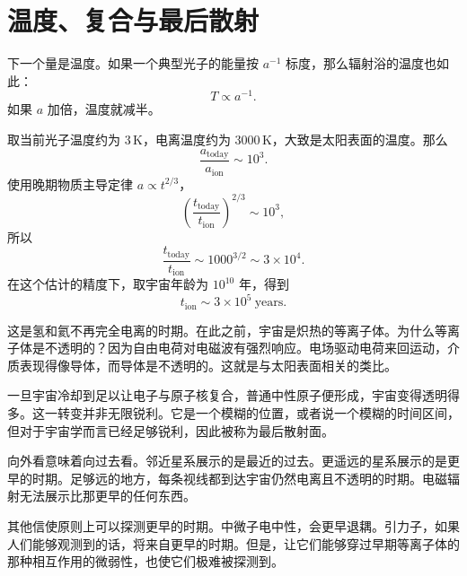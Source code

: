 \begin{classroomqa}
\end{classroomqa}

\section{温度、复合与最后散射}

下一个量是温度。如果一个典型光子的能量按 \(a^{-1}\) 标度，那么辐射浴的温度也如此：
\begin{equation}
T\propto a^{-1}.
\end{equation}
如果 \(a\) 加倍，温度就减半。

取当前光子温度约为 \(3\,\mathrm K\)，电离温度约为 \(3000\,\mathrm K\)，大致是太阳表面的温度。那么
\begin{equation}
\frac{a_{\mathrm{today}}}{a_{\mathrm{ion}}}\sim 10^3.
\end{equation}
使用晚期物质主导定律 \(a\propto t^{2/3}\)，
\begin{equation}
\left(\frac{t_{\mathrm{today}}}{t_{\mathrm{ion}}}\right)^{2/3}\sim 10^3,
\end{equation}
所以
\begin{equation}
\frac{t_{\mathrm{today}}}{t_{\mathrm{ion}}}\sim 1000^{3/2}\sim 3\times 10^4.
\end{equation}
在这个估计的精度下，取宇宙年龄为 \(10^{10}\) 年，得到
\begin{equation}
t_{\mathrm{ion}}\sim 3\times 10^5\ \mathrm{years}.
\end{equation}

这是氢和氦不再完全电离的时期。在此之前，宇宙是炽热的等离子体。为什么等离子体是不透明的？因为自由电荷对电磁波有强烈响应。电场驱动电荷来回运动，介质表现得像导体，而导体是不透明的。这就是与太阳表面相关的类比。

一旦宇宙冷却到足以让电子与原子核复合，普通中性原子便形成，宇宙变得透明得多。这一转变并非无限锐利。它是一个模糊的位置，或者说一个模糊的时间区间，但对于宇宙学而言已经足够锐利，因此被称为最后散射面。

向外看意味着向过去看。邻近星系展示的是最近的过去。更遥远的星系展示的是更早的时期。足够远的地方，每条视线都到达宇宙仍然电离且不透明的时期。电磁辐射无法展示比那更早的任何东西。

其他信使原则上可以探测更早的时期。中微子电中性，会更早退耦。引力子，如果人们能够观测到的话，将来自更早的时期。但是，让它们能够穿过早期等离子体的那种相互作用的微弱性，也使它们极难被探测到。


